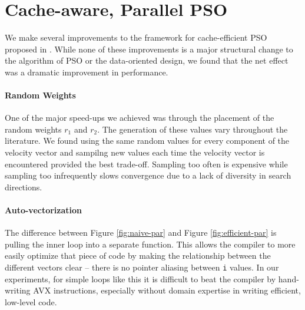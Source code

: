 \section{Cache-aware, Parallel PSO}\label{sec:algo}
We make several improvements to the framework for cache-efficient PSO proposed
in \cite{cache-pso}. While none of these improvements is a major structural
change to the algorithm of PSO or the data-oriented design, we found that the
net effect was a dramatic improvement in performance.

\paragraph{Random Weights} One of the major speed-ups we achieved was through
the placement of the random weights $r_1$ and $r_2$. The generation of these
values vary throughout the literature. We found using the same random values for
every component of the velocity vector and sampilng new values each time the
velocity vector is encountered provided the best trade-off. Sampling too often
is expensive while sampling too infrequently slows convergence due to a lack of
diversity in search directions.

\paragraph{Auto-vectorization}
The difference between Figure \ref{fig:naive-par} and Figure
\ref{fig:efficient-par} is pulling the inner loop into a separate function. This
allows the compiler to more easily optimize that piece of code by making the
relationship between the different vectors clear -- there is no pointer aliasing
between \texttt{i} values. In our experiments, for simple loops like this it is
difficult to beat the compiler by hand-writing AVX instructions, especially
without domain expertise in writing efficient, low-level code.

